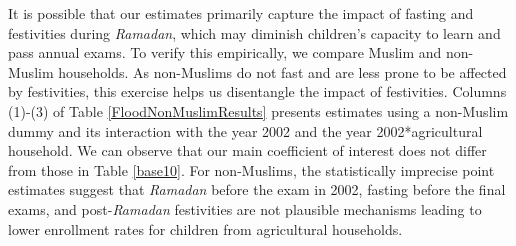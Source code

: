 \documentclass[12pt,letterpaper]{article}
\newcommand{\0}{\ensuremath{\mbox{\boldmath $0$}}}
\begin{document}
It is possible that our estimates primarily capture the impact of fasting and festivities during \textit{Ramadan}, which may diminish children's capacity to learn and pass annual exams. To verify this empirically, we compare Muslim and non-Muslim households. As non-Muslims do not fast and are less prone to be affected by festivities, this exercise helps us disentangle the impact of festivities. Columns (1)-(3) of Table \ref{FloodNonMuslimResults} presents estimates using a non-Muslim dummy and its interaction with the year 2002 and the year 2002*agricultural household. We can observe that our main coefficient of interest does not differ from those in Table \ref{base10}. For non-Muslims, the statistically imprecise point estimates suggest that \textit{Ramadan} before the exam in 2002, fasting before the final exams, and post-\textit{Ramadan} festivities are not plausible mechanisms leading to lower enrollment rates for children from agricultural households.
\end{document}

